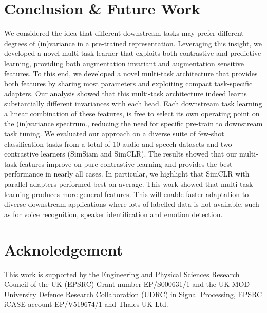 \documentclass{INTERSPEECH2023}
\begin{document}
\section{Conclusion \& Future Work}
We considered the idea that different downstream tasks may prefer different degrees of (in)variance in a pre-trained representation. Leveraging this insight, we developed a novel multi-task learner that exploits both contrastive and predictive learning, providing both augmentation invariant and augmentation sensitive features. To this end, we developed a novel multi-task architecture that provides both features by sharing most parameters and exploiting compact task-specific adapters. Our analysis showed that this multi-task architecture indeed learns substantially different invariances with each head. Each downstream task learning a linear combination of these features, is free to select its own operating point on the (in)variance spectrum., reducing the need for specific pre-train to downstream task tuning. We evaluated our approach on a diverse suite of few-shot classification tasks from a total of 10 audio and speech datasets and two contrastive learners (SimSiam and SimCLR). The results showed that our multi-task features improve on pure contrastive learning and provides the best performance in nearly all cases. In particular, we highlight that SimCLR with parallel adapters performed best on average. This work showed that multi-task learning produces more general features. This will enable faster adaptation to diverse downstream applications where lots of labelled data is not available, such as for voice recognition, speaker identification and emotion detection.

\section{Acknoledgement}
This work is supported by the Engineering and Physical
Sciences Research Council of the UK (EPSRC) Grant number
EP/S000631/1 and the UK MOD University Defence Research
Collaboration (UDRC) in Signal Processing, EPSRC iCASE account EP/V519674/1 and Thales UK Ltd. 

\newpage


\end{document}
